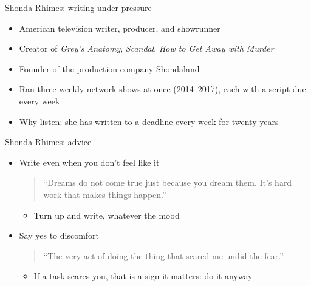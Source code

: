 \documentclass[aspectratio=169]{beamer}
\begin{document}
\begin{frame}{Shonda Rhimes: writing under pressure}
  \begin{itemize}
    \item American television writer, producer, and showrunner
    \item Creator of \emph{Grey's Anatomy}, \emph{Scandal}, \emph{How to Get Away with Murder}
    \item Founder of the production company Shondaland
    \item Ran three weekly network shows at once (2014--2017), each with a script due every week
    \item Why listen: she has written to a deadline every week for twenty years
  \end{itemize}
\end{frame}
\begin{frame}{Shonda Rhimes: advice}
  \begin{itemize}
  \item Write even when you don't feel like it
    \begin{quote}
    ``Dreams do not come true just because you dream them.  It's hard work
    that makes things happen.'' \hfill \citep{rhimes:dartmouth2014}
  \end{quote}
   \begin{itemize}
    \item Turn up and write, whatever the mood
  \end{itemize}
\item Say yes to discomfort
  \begin{quote}
    ``The very act of doing the thing that scared me undid the fear.''
    \hfill \citep{rhimes:ted2016}
  \end{quote}
  \begin{itemize}
    \item If a task scares you, that is a sign it matters: do it anyway
    \end{itemize}
  \end{itemize}
\end{frame}
\end{document}

